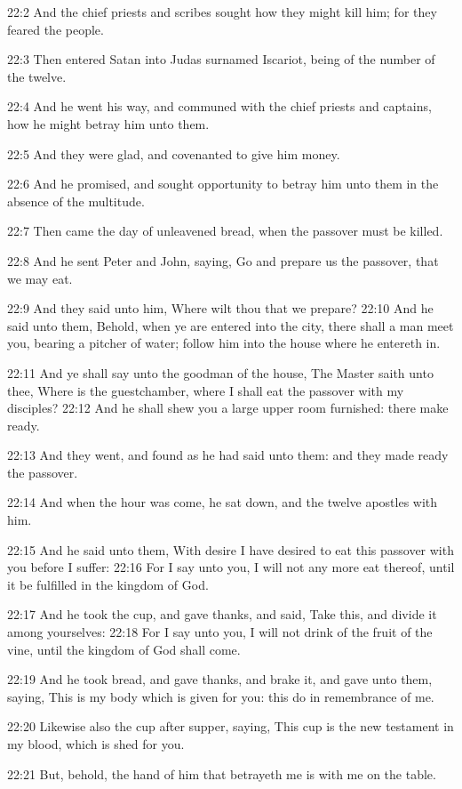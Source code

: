 22:2 And the chief priests and scribes sought how they might kill him; for they feared the people.

22:3 Then entered Satan into Judas surnamed Iscariot, being of the number of the twelve.

22:4 And he went his way, and communed with the chief priests and captains, how he might betray him unto them.

22:5 And they were glad, and covenanted to give him money.

22:6 And he promised, and sought opportunity to betray him unto them in the absence of the multitude.

22:7 Then came the day of unleavened bread, when the passover must be killed.

22:8 And he sent Peter and John, saying, Go and prepare us the passover, that we may eat.

22:9 And they said unto him, Where wilt thou that we prepare?  22:10 And he said unto them, Behold, when ye are entered into the city, there shall a man meet you, bearing a pitcher of water; follow him into the house where he entereth in.

22:11 And ye shall say unto the goodman of the house, The Master saith unto thee, Where is the guestchamber, where I shall eat the passover with my disciples?  22:12 And he shall shew you a large upper room furnished: there make ready.

22:13 And they went, and found as he had said unto them: and they made ready the passover.

22:14 And when the hour was come, he sat down, and the twelve apostles with him.

22:15 And he said unto them, With desire I have desired to eat this passover with you before I suffer: 22:16 For I say unto you, I will not any more eat thereof, until it be fulfilled in the kingdom of God.

22:17 And he took the cup, and gave thanks, and said, Take this, and divide it among yourselves: 22:18 For I say unto you, I will not drink of the fruit of the vine, until the kingdom of God shall come.

22:19 And he took bread, and gave thanks, and brake it, and gave unto them, saying, This is my body which is given for you: this do in remembrance of me.

22:20 Likewise also the cup after supper, saying, This cup is the new testament in my blood, which is shed for you.

22:21 But, behold, the hand of him that betrayeth me is with me on the table.

